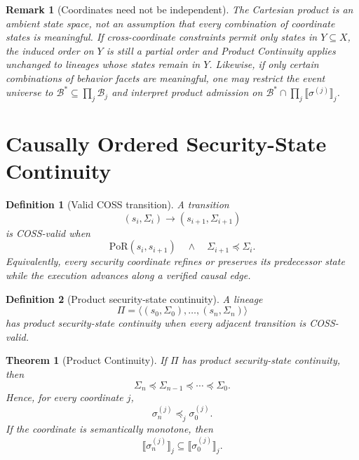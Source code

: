 \documentclass[10pt,twocolumn]{article}
\newcommand{\Model}{\textnormal{\textsc{COSS}}\xspace}
\newcommand{\PoR}{\mathrm{PoR}}
\newcommand{\sem}[1]{\llbracket #1 \rrbracket}
\newcommand{\state}{\Sigma}
\newcommand{\coord}{\sigma}
\newtheorem{definition}{Definition}
\newtheorem{theorem}{Theorem}
\newtheorem{remark}{Remark}
\begin{document}
\begin{remark}[Coordinates need not be independent]
The Cartesian product is an ambient state space, not an assumption that every
combination of coordinate states is meaningful. If cross-coordinate constraints
permit only states in $Y\subseteq X$, the induced order on $Y$ is still a
partial order and Product Continuity applies unchanged to lineages whose states
remain in $Y$. Likewise, if only certain combinations of behavior facets are
meaningful, one may restrict the event universe to
$\mathcal{B}^{*}\subseteq\prod_j\mathcal{B}_j$ and interpret product admission
on $\mathcal{B}^{*}\cap\prod_j\sem{\coord^{(j)}}_j$.
\end{remark}


\section{Causally Ordered Security-State Continuity}

\begin{definition}[Valid \Model transition]
A transition
\begin{equation}
  (s_i,\state_i)\longrightarrow(s_{i+1},\state_{i+1})
\end{equation}
is \Model-valid when
\begin{equation}
  \PoR(s_i,s_{i+1})
  \quad\land\quad
  \state_{i+1}\preceq\state_i.
  \label{eq:valid-cosst}
\end{equation}
Equivalently, every security coordinate refines or preserves its predecessor
state while the execution advances along a verified causal edge.
\end{definition}

\begin{definition}[Product security-state continuity]
A lineage
\begin{equation}
  \Pi=\langle(s_0,\state_0),\ldots,(s_n,\state_n)\rangle
\end{equation}
has product security-state continuity when every adjacent transition is
\Model-valid.
\end{definition}

\begin{theorem}[Product Continuity]
If $\Pi$ has product security-state continuity, then
\begin{equation}
  \state_n\preceq\state_{n-1}\preceq\cdots\preceq\state_0.
\end{equation}
Hence, for every coordinate $j$,
\begin{equation}
  \coord_n^{(j)}\preceq_j\coord_0^{(j)}.
  \label{eq:component-origin-bound}
\end{equation}
If the coordinate is semantically monotone, then
\begin{equation}
  \sem{\coord_n^{(j)}}_j
  \subseteq
  \sem{\coord_0^{(j)}}_j.
\end{equation}
\end{theorem}
\end{document}
